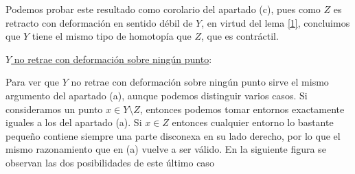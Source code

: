 \documentclass[twoside]{article}
\begin{document}
\begin{solucion}
\begin{enumerate}
%

Podemos probar este resultado como corolario del apartado (c), pues como $Z$ es retracto con deformación en sentido débil de $Y$, en virtud del lema \ref{1}, concluimos que $Y$ tiene el mismo tipo de homotopía que $Z$, que es contráctil. 


\underline{$Y$ no retrae con deformación sobre ningún punto}:

Para ver que $Y$ no retrae con deformación sobre ningún punto sirve el mismo argumento del apartado (a), aunque podemos distinguir varios casos. Si consideramos un punto $x\in Y\setminus Z$, entonces podemos tomar entornos exactamente iguales a los del apartado (a). Si $x\in Z$ entonces cualquier entorno lo bastante pequeño contiene siempre una parte disconexa en su lado derecho, por lo que el mismo razonamiento que en (a) vuelve a ser válido. En la siguiente figura se observan las dos posibilidades de este último caso


\end{enumerate}
\end{solucion}
\end{document}
